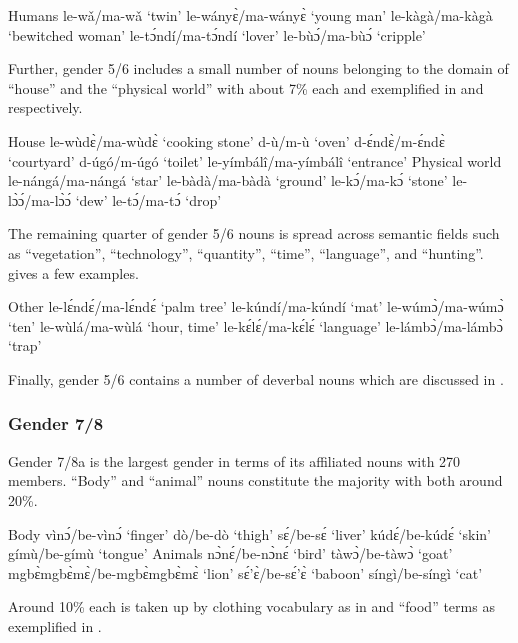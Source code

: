 \ea\label{5/6hum} Humans
\ea le-wǎ/ma-wǎ `twin'
\ex le-wányɛ̀/ma-wányɛ̀ `young man'
\ex le-kàgà/ma-kàgà `bewitched woman'
\ex le-tɔ́ndí/ma-tɔ́ndí `lover'
\ex le-bùɔ́/ma-bùɔ́ `cripple'
\z
\z

\noindent Further, gender 5/6 includes a small number of nouns belonging to the domain of ``house'' and the ``physical world'' with about 7\% each and exemplified in  and  respectively.

\ea\label{5/6house} House
\ea le-wùdɛ̀/ma-wùdɛ̀ `cooking stone'
\ex d-ù/m-ù `oven'
\ex d-ɛ́ndɛ̀/m-ɛ́ndɛ̀ `courtyard'
\ex d-úgó/m-úgó `toilet'
\ex le-yímbálî/ma-yímbálî `entrance' 
\z
\ex\label{5/6world} Physical world
\ea le-nángá/ma-nángá `star'
\ex le-bàdà/ma-bàdà `ground'
\ex le-kɔ́/ma-kɔ́ `stone'
\ex le-lɔ̀ɔ́/ma-lɔ̀ɔ́ `dew'
\ex le-tɔ́/ma-tɔ́ `drop'
\z
\z

\noindent The remaining quarter of gender 5/6 nouns is spread across semantic fields such as ``vegetation'', ``technology'', ``quantity'', ``time'', ``language'', and ``hunting''.  gives a few examples.

\ea\label{5/6other} Other
\ea le-lɛ́ndɛ́/ma-lɛ́ndɛ́ `palm tree'
\ex le-kúndí/ma-kúndí `mat'
\ex le-wúmɔ̀/ma-wúmɔ̀ `ten'
\ex le-wùlá/ma-wùlá `hour, time'
\ex le-kɛ́lɛ́/ma-kɛ́lɛ́ `language'
\ex le-lámbɔ̀/ma-lámbɔ̀ `trap'
\z
\z

\noindent Finally, gender 5/6 contains a number of deverbal nouns which are discussed in .


\subsubsection{Gender 7/8}
\label{sec:7/8}

Gender 7/8a is the largest gender in terms of its affiliated nouns with 270 members. ``Body''  and ``animal''  nouns constitute the majority with both around 20\%.

\ea\label{7/8body} Body
\ea vìnɔ́/be-vìnɔ́ `finger'
\ex dò/be-dò `thigh'
\ex sɛ́/be-sɛ́ `liver'
\ex kúdɛ́/be-kúdɛ́ `skin'
\ex gímù/be-gímù `tongue'
\z
\ex\label{7/8animals} Animals
\ea nɔ̀nɛ́/be-nɔ̀nɛ́ `bird'
\ex tàwɔ̀/be-tàwɔ̀ `goat'
\ex mgbɛ̀mgbɛ̀mɛ̀/be-mgbɛ̀mgbɛ̀mɛ̀ `lion'
\ex sɛ́'ɛ̀/be-sɛ́'ɛ̀ `baboon'
\ex síngì/be-síngì `cat'
\z
\z

\noindent Around 10\% each is taken up by clothing vocabulary as in  and ``food'' terms as exemplified in .

